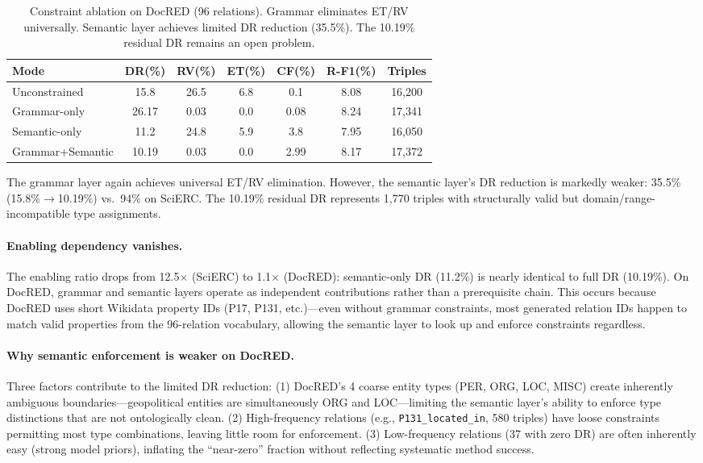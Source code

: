 \documentclass[11pt,a4paper]{article}
\begin{document}
\begin{table}[t]
\centering
\caption{Constraint ablation on DocRED (96 relations). Grammar eliminates ET/RV universally. Semantic layer achieves limited DR reduction (35.5\%). The 10.19\% residual DR remains an open problem.}
\label{tab:docred_ablation}
\begin{tabular}{lcccccc}
\toprule
\textbf{Mode} & \textbf{DR(\%)} & \textbf{RV(\%)} & \textbf{ET(\%)} & \textbf{CF(\%)} & \textbf{R-F1(\%)} & \textbf{Triples} \\
\midrule
Unconstrained    & 15.8  & 26.5  & 6.8 & 0.1  & 8.08 & 16,200 \\
Grammar-only     & 26.17 & 0.03  & 0.0 & 0.08 & 8.24 & 17,341 \\
Semantic-only    & 11.2  & 24.8  & 5.9 & 3.8  & 7.95 & 16,050 \\
Grammar+Semantic & 10.19 & 0.03  & 0.0 & 2.99 & 8.17 & 17,372 \\
\bottomrule
\end{tabular}
\end{table}

The grammar layer again achieves universal ET/RV elimination.
However, the semantic layer's DR reduction is markedly weaker: 35.5\% (15.8\%${\to}$10.19\%) vs.\ 94\% on SciERC.
The 10.19\% residual DR represents 1,770 triples with structurally valid but domain/range-incompatible type assignments.

\paragraph{Enabling dependency vanishes.}
The enabling ratio drops from 12.5$\times$ (SciERC) to 1.1$\times$ (DocRED): semantic-only DR (11.2\%) is nearly identical to full DR (10.19\%).
On DocRED, grammar and semantic layers operate as independent contributions rather than a prerequisite chain.
This occurs because DocRED uses short Wikidata property IDs (P17, P131, etc.)---even without grammar constraints, most generated relation IDs happen to match valid properties from the 96-relation vocabulary, allowing the semantic layer to look up and enforce constraints regardless.

\paragraph{Why semantic enforcement is weaker on DocRED.}
Three factors contribute to the limited DR reduction:
(1) DocRED's 4 coarse entity types (PER, ORG, LOC, MISC) create inherently ambiguous boundaries---geopolitical entities are simultaneously ORG and LOC---limiting the semantic layer's ability to enforce type distinctions that are not ontologically clean.
(2) High-frequency relations (e.g., \texttt{P131\_located\_in}, 580 triples) have loose constraints permitting most type combinations, leaving little room for enforcement.
(3) Low-frequency relations (37 with zero DR) are often inherently easy (strong model priors), inflating the ``near-zero'' fraction without reflecting systematic method success.
\end{document}
